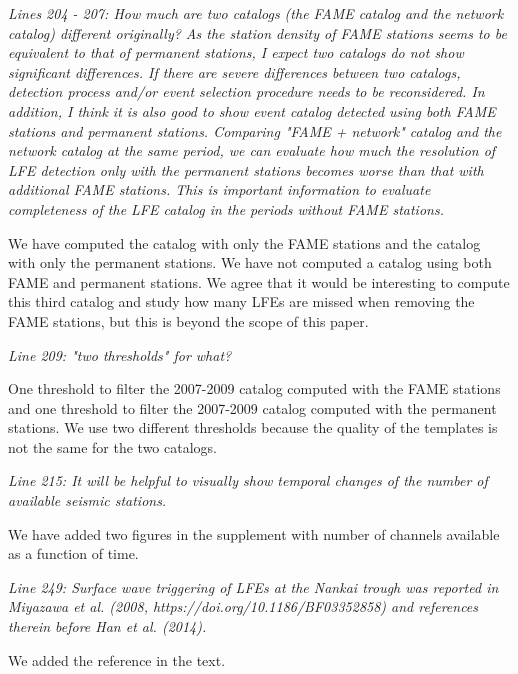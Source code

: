 \documentclass[letterpaper, 12pt]{article}
\begin{document}
\textit{Lines 204 - 207: How much are two catalogs (the FAME catalog and the network catalog) different originally? As the station density of FAME stations seems to be equivalent to that of permanent stations, I expect two catalogs do not show significant differences. If there are severe differences between two catalogs, detection process and/or event selection procedure needs to be reconsidered. In addition, I think it is also good to show event catalog detected using both FAME stations and permanent stations. Comparing "FAME + network" catalog and the network catalog at the same period, we can evaluate how much the resolution of LFE detection only with the permanent stations becomes worse than that with additional FAME stations. This is important information to evaluate completeness of the LFE catalog in the periods without FAME stations.}

\bigskip

We have computed the catalog with only the FAME stations and the catalog with only the permanent stations. We have not computed a catalog using both FAME and permanent stations. We agree that it would be interesting to compute this third catalog and study how many LFEs are missed when removing the FAME stations, but this is beyond the scope of this paper.

\bigskip

\textit{Line 209: "two thresholds" for what?}

\bigskip

One threshold to filter the 2007-2009 catalog computed with the FAME stations and one threshold to filter the 2007-2009 catalog computed with the permanent stations. We use two different thresholds because the quality of the templates is not the same for the two catalogs.

\bigskip

\textit{Line 215: It will be helpful to visually show temporal changes of the number of available seismic stations.}

\bigskip

We have added two figures in the supplement with number of channels available as a function of time.

\bigskip

\textit{Line 249: Surface wave triggering of LFEs at the Nankai trough was reported in Miyazawa et al. (2008, https://doi.org/10.1186/BF03352858) and references therein before Han et al. (2014).}

\bigskip

We added the reference in the text.
\end{document}
